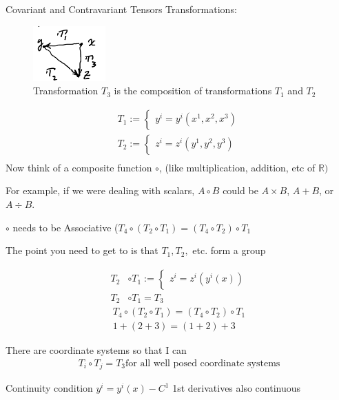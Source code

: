 \documentclass{article}
\newenvironment{aside}{\begin{mdframed}}{\end{mdframed}}
\begin{document}
\begin{section}{Covariant and Contravariant Tensors}
  Transformations:
	\begin{figure}[h]
		\centering
		\includegraphics[height=060pt]{Transformation1}
		\caption{Transformation $T_3$ is the composition of transformations $T_1$ and $T_2$}
		\label{fig:T1}
	\end{figure}
	\begin{align*}T_1 := \begin{cases}y^i = y^i(x^1,x^2,x^3)\end{cases}\\
  T_2 :=\begin{cases} z^i = z^i(y^1,y^2,y^3)\end{cases}\\
    \end{align*}
    Now think of a composite function $\circ$, (like multiplication, addition, etc of $\mathbb{R})$
    \begin{aside}
			For example, if we were dealing with scalars, $A\circ B$ could be $A\times B$, $A+B$, or $A\div B$.

			$\circ$ needs to be Associative ($T_4\circ(T_2\circ T_1) = (T_4\circ T_2) \circ T_1$
			
			The point you need to get to is that $T_1,T_2,$ etc. form a group
		\end{aside}
      \begin{align*}
      T_2 &\circ T_1 := \begin{cases}z^i = z^i(y^i(x))\end{cases}\\
	T_2&\circ T_1 = T_3
      \end{align*}
      \begin{align*}
	T_4\circ (T_2\circ T_1) = (T_4\circ T_2)\circ T_1\\
	1 + (2+3) = (1+2) + 3
      \end{align*}

      There are coordinate systems so that I can 
      \begin{align*}
	T_i\circ T_j = T_3 \text{for all well posed coordinate systems}
      \end{align*}

      Continuity condition $y^i = y^i(x) - C^1$ 1st derivatives also continuous


\end{section}
\end{document}
